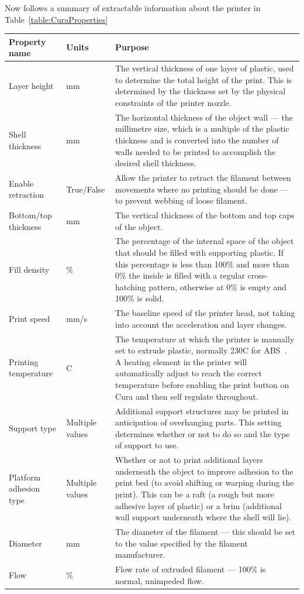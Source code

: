 \documentclass[pdftex, 11pt]{report} %
\begin{document}
Now follows a summary of extractable information about the printer in Table~\ref{table:CuraProperties}
\begin{table}[h]{\begin{minipage}{\textwidth}
\begin{tabular}{| p{3cm} | p{2cm} | p{8.5cm} |}
\hline

Property name & Units & Purpose\\\hline
Layer height & mm & The vertical thickness of one layer of plastic, used to determine the total height of the print. This is determined by the thickness set by the physical constraints of the printer nozzle.\\\hline
Shell thickness & mm & The horizontal thickness of the object wall --- the millimetre size, which is a multiple of the plastic thickness and is converted into the number of walls needed to be printed to accomplish the desired shell thickness.\\\hline
Enable retraction & True/False & Allow the printer to retract the filament between movements where no printing should be done --- to prevent webbing of loose filament.\\\hline
Bottom/top thickness & mm & The vertical thickness of the bottom and top caps of the object.\\\hline
Fill density & \% & The percentage of the internal space of the object that should be filled with supporting plastic. If this percentage is less than 100\% and more than 0\% the inside is filled with a regular cross-hatching pattern, otherwise at 0\% is empty and 100\% is solid.\\\hline
Print speed & mm/s & The baseline speed of the printer head, not taking into account the acceleration and layer changes.\\\hline
Printing temperature & \degree{}C & The temperature at which the printer is manually set to extrude plastic, normally 230\degree{}C for ABS~\cite{RepRap2014}. A heating element in the printer will automatically adjust to reach the correct temperature before enabling the print button on Cura and then self regulate throughout.\\\hline
Support type & Multiple values & Additional support structures may be printed in anticipation of overhanging parts. This setting determines whether or not to do so and the type of support to use.\\\hline
Platform adhesion type & Multiple values & Whether or not to print additional layers underneath the object to improve adhesion to the print bed (to avoid shifting or warping during the print). This can be a raft (a rough but more adhesive layer of plastic) or a brim (additional wall support underneath where the shell will lie).\\\hline
Diameter & mm & The diameter of the filament --- this should be set to the value specified by the filament manufacturer.\\\hline
Flow & \% & Flow rate of extruded filament --- 100\% is normal, unimpeded flow.\\\hline


\end{tabular}
\end{minipage}}
\end{table}
\end{document}
